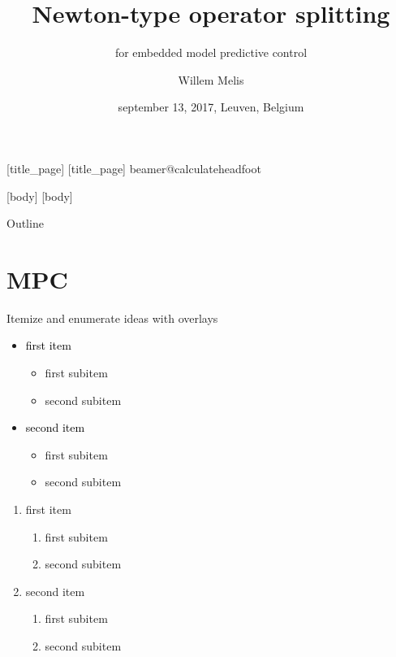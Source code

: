 \documentclass[11pt,t]{beamer}
\title{Newton-type operator splitting }
\author{Willem Melis}
\institute{KU Leuven}
\subtitle{for embedded model predictive control }
\date{september 13, 2017, Leuven, Belgium}
\begin{document}
	[title_page]
	[title_page]
	\csname beamer@calculateheadfoot\endcsname %
		\begin{frame}
			\titlepage
		\end{frame}
	[body]
	[body]

\begin{frame}{Outline}
	\vskip 5mm
	\hfill	{\large \parbox{.95\textwidth}{\tableofcontents[hideallsubsections]}}
\end{frame}

\section{MPC}
\begin{frame}{Itemize and enumerate ideas with overlays}
	\begin{itemize}
		\item \textcolor{black}{first item}
			\begin{itemize}
				\item first subitem
				\item second subitem
			\end{itemize}
		\item \textcolor{black}{second item}
			\begin{itemize}
				\item first subitem
				\item second subitem
			\end{itemize}
	\end{itemize}
	\vspace{2mm}
	\begin{enumerate}
		\item<2-> first item
		\begin{enumerate}
			\item first subitem
			\item second subitem
		\end{enumerate}
		\item<2-> second item
		\begin{enumerate}
			\item first subitem
			\item second subitem
		\end{enumerate}
	\end{enumerate}
\end{frame}
\end{document}
